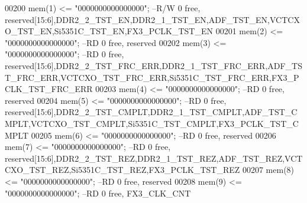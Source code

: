 \begin{DoxyCode}
00200             \textcolor{vhdlchar}{mem}\textcolor{vhdlchar}{(}\textcolor{vhdllogic}{}\textcolor{vhdllogic}{1}\textcolor{vhdlchar}{)}  \textcolor{vhdlchar}{<=} \textcolor{vhdllogic}{"0000000000000000"};\textcolor{keyword}{ --R/W  0 free,
       reserved[15:6],DDR2\_2\_TST\_EN,DDR2\_1\_TST\_EN,ADF\_TST\_EN,VCTCXO\_TST\_EN,Si5351C\_TST\_EN,FX3\_PCLK\_TST\_EN}
00201             \textcolor{vhdlchar}{mem}\textcolor{vhdlchar}{(}\textcolor{vhdllogic}{}\textcolor{vhdllogic}{2}\textcolor{vhdlchar}{)}  \textcolor{vhdlchar}{<=} \textcolor{vhdllogic}{"0000000000000000"};\textcolor{keyword}{ --RD     0 free, reserved}
00202             \textcolor{vhdlchar}{mem}\textcolor{vhdlchar}{(}\textcolor{vhdllogic}{}\textcolor{vhdllogic}{3}\textcolor{vhdlchar}{)}  \textcolor{vhdlchar}{<=} \textcolor{vhdllogic}{"0000000000000000"};\textcolor{keyword}{ --RD     0 free,
       reserved[15:6],DDR2\_2\_TST\_FRC\_ERR,DDR2\_1\_TST\_FRC\_ERR,ADF\_TST\_FRC\_ERR,VCTCXO\_TST\_FRC\_ERR,Si5351C\_TST\_FRC\_ERR,FX3\_PCLK\_TST\_FRC\_ERR}
00203             \textcolor{vhdlchar}{mem}\textcolor{vhdlchar}{(}\textcolor{vhdllogic}{}\textcolor{vhdllogic}{4}\textcolor{vhdlchar}{)}  \textcolor{vhdlchar}{<=} \textcolor{vhdllogic}{"0000000000000000"};\textcolor{keyword}{ --RD     0 free, reserved}
00204             \textcolor{vhdlchar}{mem}\textcolor{vhdlchar}{(}\textcolor{vhdllogic}{}\textcolor{vhdllogic}{5}\textcolor{vhdlchar}{)}  \textcolor{vhdlchar}{<=} \textcolor{vhdllogic}{"0000000000000000"};\textcolor{keyword}{ --RD     0 free,
       reserved[15:6],DDR2\_2\_TST\_CMPLT,DDR2\_1\_TST\_CMPLT,ADF\_TST\_CMPLT,VCTCXO\_TST\_CMPLT,Si5351C\_TST\_CMPLT,FX3\_PCLK\_TST\_CMPLT}
00205             \textcolor{vhdlchar}{mem}\textcolor{vhdlchar}{(}\textcolor{vhdllogic}{}\textcolor{vhdllogic}{6}\textcolor{vhdlchar}{)}  \textcolor{vhdlchar}{<=} \textcolor{vhdllogic}{"0000000000000000"};\textcolor{keyword}{ --RD     0 free, reserved}
00206             \textcolor{vhdlchar}{mem}\textcolor{vhdlchar}{(}\textcolor{vhdllogic}{}\textcolor{vhdllogic}{7}\textcolor{vhdlchar}{)}  \textcolor{vhdlchar}{<=} \textcolor{vhdllogic}{"0000000000000000"};\textcolor{keyword}{ --RD     0 free,
       reserved[15:6],DDR2\_2\_TST\_REZ,DDR2\_1\_TST\_REZ,ADF\_TST\_REZ,VCTCXO\_TST\_REZ,Si5351C\_TST\_REZ,FX3\_PCLK\_TST\_REZ}
00207             \textcolor{vhdlchar}{mem}\textcolor{vhdlchar}{(}\textcolor{vhdllogic}{}\textcolor{vhdllogic}{8}\textcolor{vhdlchar}{)}  \textcolor{vhdlchar}{<=} \textcolor{vhdllogic}{"0000000000000000"};\textcolor{keyword}{ --RD     0 free, reserved}
00208             \textcolor{vhdlchar}{mem}\textcolor{vhdlchar}{(}\textcolor{vhdllogic}{}\textcolor{vhdllogic}{9}\textcolor{vhdlchar}{)}  \textcolor{vhdlchar}{<=} \textcolor{vhdllogic}{"0000000000000000"};\textcolor{keyword}{ --RD 0 free, FX3\_CLK\_CNT         }

\end{DoxyCode}
